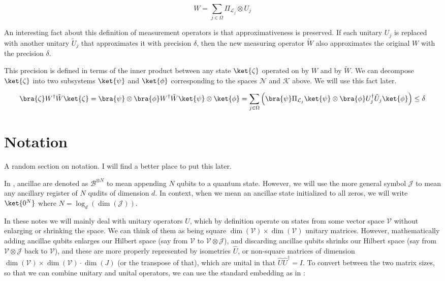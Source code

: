 \begin{equation}
W = \sum_{j \in \Omega} \Pi_{\mathcal{L}_j} \otimes U_j
\end{equation}

An interesting fact about this definition of measurement operators is
that approximativeness is preserved. If each unitary $U_j$ is replaced with
another unitary $\tilde{U}_j$ that approximates it with precision $\delta$,
then the new measuring operator $\tilde{W}$ also approximates the original
$W$ with the precision $\delta$.

This precision is defined in terms of the inner product between any state
$\ket{\zeta}$
operated
on by $W$ and by $\tilde{W}$. We can decompose $\ket{\zeta}$ into
two subsystems $\ket{\psi}$ and $\ket{\phi}$
corresponding to the spaces $\mathcal{N}$ and $\mathcal{K}$
above. We will use this fact later.

\begin{equation}
\bra{\zeta} W^{\dag} \tilde{W} \ket{\zeta} =
\bra{\psi} \otimes \bra{\phi} W^{\dag} \tilde{W} \ket{\psi} \otimes \ket{\phi} =
\sum_{j \in \Omega} \left( \bra{\psi} \Pi_{\mathcal{L}_j} \ket{\psi} \otimes
\bra{\phi} U^{\dag}_j \tilde{U}_j \ket{\phi} \right) \le \delta
\end{equation}

\section{Notation}

A random section on notation. I will find a better place to put this later.

In \cite{Kitaev2002}, ancillae are denoted as $\mathcal{B}^{\otimes N}$ to mean
appending $N$ qubits to a quantum state. However, we will use the more general
symbol $\mathcal{J}$ to mean any ancillary register of $N$ qudits of dimension $d$.
In context,
when we mean an ancillae state initialized to all zeros, we will write
$\ket{0^N}$ where $N = \log_d(\dim(\mathcal{J}))$.

In these notes we will mainly deal with unitary operators $U$, which by
definition operate on
states from some vector space $\mathcal{V}$
without enlarging or shrinking the space.
We can think of them as being square
$\dim(\mathcal{V}) \times \dim(\mathcal{V})$
unitary matrices.
However, mathematically adding ancillae qubits enlarges our Hilbert space
(say from $\mathcal{V}$ to $\mathcal{V}\otimes \mathcal{J}$),
and discarding ancillae qubits shrinks our Hilbert space
(say from $\mathcal{V}\otimes \mathcal{J}$ back to $\mathcal{V}$),
and these are more properly represented by isometries $\hat{U}$,
or non-square matrices
of dimension
$\dim(\mathcal{V})\times \dim(\mathcal{V})\cdot\dim(J)$
(or the transpose of that), which are unital in that
$\hat{U}\hat{U}^\dagger = I$. To convert between the two matrix sizes,
so that we can combine unitary and unital operators, we can use the
standard embedding as in \cite{Kitaev2002}:


